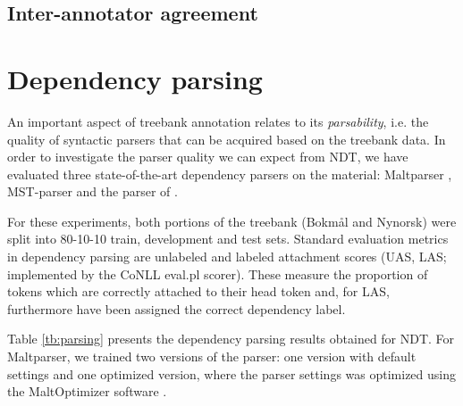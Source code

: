 \documentclass[11pt,a4paper]{article}
\begin{document}
\subsection{Inter-annotator agreement}\label{sc:inter-a}

\section{Dependency parsing}
An important aspect of treebank annotation relates to its \emph{parsability},
i.e. the quality of syntactic parsers that can be acquired based on
the treebank data.  In order to investigate the parser quality we can
expect from NDT, we have evaluated three state-of-the-art dependency
parsers on the material: Maltparser ,
MST-parser  and the parser of
.  

For these experiments, both portions of the treebank (Bokm{\aa}l and
Nynorsk) were split into 80-10-10 train, development and test sets.
Standard evaluation metrics in dependency parsing are unlabeled and
labeled attachment scores (UAS, LAS; implemented by the CoNLL
\textsf{eval.pl} scorer).  These measure the proportion of tokens
which are correctly attached to their head token and, for LAS,
furthermore have been assigned the correct dependency label.




Table \ref{tb:parsing} presents the dependency parsing results
obtained for NDT.  For Maltparser, we trained two versions of the
parser: one version with default settings and one optimized version,
where the parser settings was optimized using the MaltOptimizer
software .

\clearpage

\end{document}
